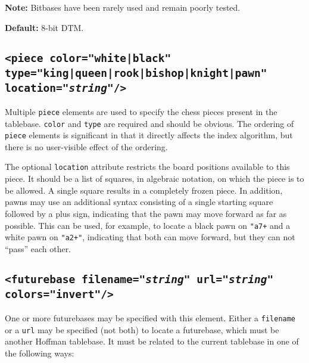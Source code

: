\documentclass[11pt]{article}
\begin{document}
{\bf Note:} Bitbases have been rarely used and remain poorly tested.

{\bf Default:} 8-bit DTM.


\subsection{\tt <piece color="white|black" type="king|queen|rook|bishop|knight|pawn" \hfil\break\hbox{\qquad} location="{\it string}"/>}

Multiple {\tt piece} elements are used to specify the chess pieces
present in the tablebase. {\tt color} and {\tt type} are required and
should be obvious.  The ordering of {\tt piece} elements is
significant in that it directly affects the index algorithm,
but there is no user-visible effect of the ordering.

The optional {\tt location} attribute restricts the board positions
available to this piece.  It should be a list of squares, in algebraic
notation, on which the piece is to be allowed.  A single square
results in a completely frozen piece.  In addition, pawns may use an
additional syntax consisting of a single starting square followed by a
plus sign, indicating that the pawn may move forward as far as
possible.  This can be used, for example, to locate a black pawn on
{\tt "a7+} and a white pawn on {\tt "a2+"}, indicating that both can
move forward, but they can not ``pass'' each other.


\subsection{\tt <futurebase filename="{\it string}" url="{\it string}" colors="invert"/>}

One or more futurebases may be specified with this element.  Either a
{\tt filename} or a {\tt url} may be specified (not both) to locate a
futurebase, which must be another Hoffman tablebase.  It must be
related to the current tablebase in one of the following ways:
\end{document}
